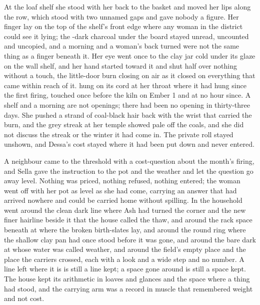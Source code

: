 At the loaf shelf she stood with her back to the basket and moved her lips along the row, which stood with two unnamed gaps and gave nobody a figure. Her finger lay on the top of the shelf's front edge where any woman in the district could see it lying; the -dark charcoal under the board stayed unread, uncounted and uncopied, and a morning and a woman's back turned were not the same thing as a finger beneath it. Her eye went once to the clay jar cold under its glaze on the wall shelf, and her hand started toward it and shut half over nothing without a touch, the little-door burn closing on air as it closed on everything that came within reach of it.  hung on its cord at her throat where it had hung since the first firing, touched once before the kiln on Ember 1 and at no hour since. A shelf and a morning are not openings; there had been no opening in thirty-three days. She pushed a strand of coal-black hair back with the wrist that carried the burn, and the grey streak at her temple showed pale off the coals, and she did not discuss the streak or the winter it had come in. The private roll stayed unshown, and Dessa's cost stayed where it had been put down and never entered.

\scenebreak

A neighbour came to the threshold with a cost-question about the month's firing, and Sella gave the instruction to the pot and the weather and let the question go away level. Nothing was priced, nothing refused, nothing entered; the woman went off with her pot as level as she had come, carrying an answer that had arrived nowhere and could be carried home without spilling. In  the household went around the clean dark line where Ash had turned the corner and the new finer hairline beside it that the house called the thaw, and around the rack space beneath  at  where the broken birth-slates lay, and around the round ring where the shallow clay pan had once stood before it was gone, and around the bare dark  at  whose water was called weather, and around the field's empty place and the place the carriers crossed, each with a look and a wide step and no number. A line left where it is is still a line kept; a space gone around is still a space kept. The house kept its arithmetic in loaves and glances and the space where a thing had stood, and the carrying arm was a record in muscle that remembered weight and not cost.

